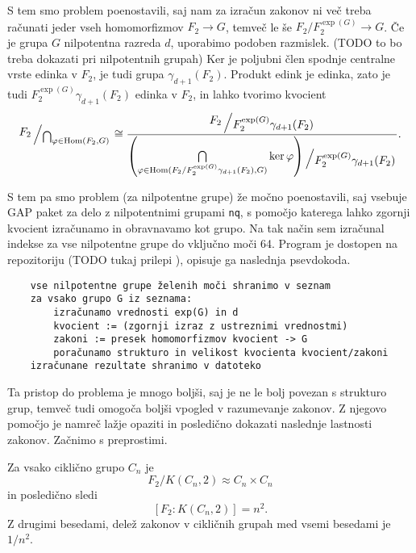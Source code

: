 \documentclass[mat1, tisk]{fmfdelo}
\newcommand{\bigslant}[2]{{\raisebox{.2em}{$#1$}\left/\raisebox{-.2em}{$#2$}\right.}}
\numberwithin{equation}{section}  %
\begin{document}
S tem smo problem poenostavili, saj nam za izračun zakonov ni več treba računati jeder vseh homomorfizmov $F_2 \to G$, temveč le še $F_2 / F_2^{\exp(G)} \to G$.
Če je grupa $G$ nilpotentna razreda $d$, uporabimo podoben razmislek. 
 (TODO to bo treba dokazati pri nilpotentnih grupah) 
Ker je poljubni člen spodnje centralne vrste edinka v $F_2$, je tudi grupa $\gamma_{d+ 1}(F_2)$.
Produkt edink je edinka, zato je tudi $F_2^{\exp(G)} \gamma_{d+ 1}(F_2)$ edinka v $F_2$, in lahko tvorimo kvocient 
\begin{equation*}
    \bigslant{F_2}{\bigcap_{\varphi \in \operatorname{Hom}(F_2, G)}} \cong \dfrac{\bigslant{F_2}{F_2^{\exp(G)}\gamma_{d+1}(F_2)}}{ \bigslant{ \left( \bigcap\limits_{\varphi \in \operatorname{Hom}({F_2} / {F_2^{\exp(G)}\gamma_{d+1}(F_2)}, G)} \ker \varphi \right) }{F_2^{\exp(G)}\gamma_{d+1}(F_2)}}.
\end{equation*}

S tem pa smo problem (za nilpotentne grupe) že močno poenostavili, saj vsebuje GAP paket za delo z nilpotentnimi grupami \texttt{nq}, s pomočjo katerega lahko zgornji kvocient izračunamo in obravnavamo kot grupo.
Na tak način sem izračunal indekse za vse nilpotentne grupe do vključno moči 64. Program je dostopen na repozitoriju (TODO tukaj prilepi ), opisuje ga naslednja psevdokoda. 

\begin{verbatim}
    vse nilpotentne grupe želenih moči shranimo v seznam 
    za vsako grupo G iz seznama:
        izračunamo vrednosti exp(G) in d
        kvocient := (zgornji izraz z ustreznimi vrednostmi)
        zakoni := presek homomorfizmov kvocient -> G
        poračunamo strukturo in velikost kvocienta kvocient/zakoni
    izračunane rezultate shranimo v datoteko
\end{verbatim}

Ta pristop do problema je mnogo boljši, saj je ne le bolj povezan s strukturo grup, temveč tudi omogoča boljši vpogled v razumevanje zakonov.
Z njegovo pomočjo je namreč lažje opaziti in posledično dokazati naslednje lastnosti zakonov. Začnimo s preprostimi.

\begin{trditev}
\label{trd_lastnosti_zakonov_ciklicne}
 Za vsako ciklično grupo $C_n$ je \begin{equation*}
 F_2 / K(C_n, 2) \approx C_n \times C_n
 \end{equation*}  
 in posledično sledi \begin{equation*}
\left[ F_2 : K(C_n, 2) \right] = n^2.
 \end{equation*}  
Z drugimi besedami, delež zakonov v cikličnih grupah med vsemi besedami je $1 / n^2$.
\end{trditev}
\begin{dokaz}

\end{dokaz}
\end{document}
